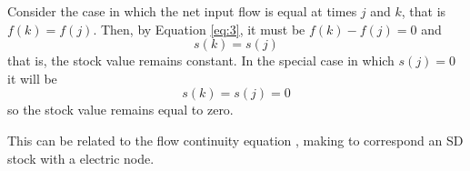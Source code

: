 \documentclass[11pt, a4paper]{article}
\theoremstyle{definition}
\theoremstyle{plain}
\theoremstyle{plain}
\theoremstyle{remark}
\theoremstyle{remark}
\theoremstyle{remark}
\begin{document}
{	Consider the case in which the net input flow is equal at times $ j $ and $ k $, that is $f (k) = f (j)$. Then, by Equation \ref{eq:3}, it must be $ f (k) - f (j) = 0 $ and
	\begin{equation}
		s(k) = s(j)
		\label{eq:4}
	\end{equation}
	that is, the stock value remains constant. In the special case in which $s(j) = 0$ it will be
	\begin{equation}
		s(k) = s(j) = 0
		\label{eq:5}
	\end{equation}
	so the stock value remains equal to zero.
	
	
	This can be related to the flow continuity equation \cite{Euler1757}, making to correspond an SD stock with a electric node. 
	
	
}
\end{document}
